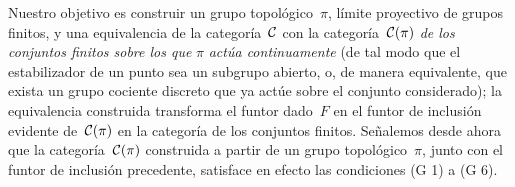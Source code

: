 Nuestro objetivo es construir un grupo topológico~$\pi$, límite proyectivo
de grupos finitos, y una equivalencia de la categoría~$\cal{C}$ con la
categoría~$\cal{C}(\pi)$
\label{indnot:eb}%
\emph{de los conjuntos finitos sobre los que} $\pi$ \emph{actúa
continuamente} (\ie de tal modo que el estabilizador de un punto sea un
subgrupo abierto, o, de manera equivalente, que exista un grupo cociente
discreto que ya actúe sobre el conjunto considerado); la equivalencia
construida transforma el funtor dado~$F$ en el funtor de inclusión evidente
de~$\cal{C}(\pi)$ en la categoría de los conjuntos finitos. Señalemos desde
ahora que la categoría~$\cal{C}(\pi)$ construida a partir de un grupo
topológico~$\pi$, junto con el funtor de inclusión precedente, satisface en
efecto las condiciones (G 1) a (G 6).

